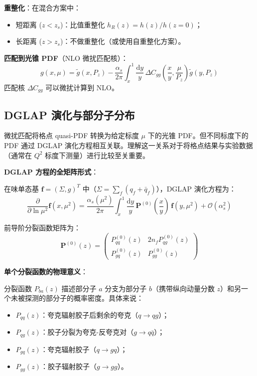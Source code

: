 \documentclass[11pt,a4paper]{ctexart}
\newcommand{\order}[1]{\mathcal{O}(#1)}
\begin{document}
\textbf{重整化}：在混合方案中：
\begin{itemize}
  \item 短距离 ($z < z_s$)：比值重整化 $h_R(z) = h(z) / h(z=0)$；
  \item 长距离 ($z > z_s$)：不做重整化（或使用自重整化方案）。
\end{itemize}

\textbf{匹配到光锥 PDF}（NLO 微扰匹配核）：
\begin{equation}\label{eq:matching}
\boxed{g(x, \mu) = \tilde{g}(x, P_z) - \frac{\alpha_s}{2\pi}
\int_{x}^{1} \frac{\mathrm{d}y}{y} \,
\Delta C_{gg}\!\left(\frac{x}{y}, \frac{\mu}{P_z}\right)
\tilde{g}(y, P_z)}
\end{equation}
匹配核 $\Delta C_{gg}$ 可以微扰计算到 NLO。

\subsection{DGLAP 演化与部分子分布}

微扰匹配将格点 quasi-PDF 转换为给定标度 $\mu$ 下的光锥 PDF。但不同标度下的 PDF 通过 DGLAP 演化方程相互关联。理解这一关系对于将格点结果与实验数据（通常在 $Q^2$ 标度下测量）进行比较至关重要。

\textbf{DGLAP 方程的全矩阵形式}：

在味单态基 $\mathbf{f} = (\Sigma, g)^T$ 中（$\Sigma = \sum_f (q_f + \bar{q}_f)$），DGLAP 演化方程为：
\begin{equation}
\frac{\partial}{\partial \ln \mu^2} \mathbf{f}(x, \mu^2) =
\frac{\alpha_s(\mu^2)}{2\pi} \int_x^1 \frac{\mathrm{d}y}{y} \,
\mathbf{P}^{(0)}\!\left(\frac{x}{y}\right) \,
\mathbf{f}(y, \mu^2) + \order{\alpha_s^2}
\end{equation}

前导阶分裂函数矩阵为：
\begin{equation}
\mathbf{P}^{(0)}(z) = \begin{pmatrix}
P_{qq}^{(0)}(z) & 2n_f P_{qg}^{(0)}(z) \\[4pt]
P_{gq}^{(0)}(z) & P_{gg}^{(0)}(z)
\end{pmatrix}
\end{equation}

\textbf{单个分裂函数的物理意义}：

分裂函数 $P_{ba}(z)$ 描述部分子 $a$ 分支为部分子 $b$（携带纵向动量分数 $z$）和另一个未被探测的部分子的概率密度。具体来说：
\begin{itemize}
  \item $P_{qq}(z)$：夸克辐射胶子后剩余的夸克（$q \to qg$）；
  \item $P_{qg}(z)$：胶子分裂为夸克-反夸克对（$g \to q\bar{q}$）；
  \item $P_{gq}(z)$：夸克辐射胶子（$q \to gq$）；
  \item $P_{gg}(z)$：胶子辐射胶子（$g \to gg$）。
\end{itemize}
\end{document}
